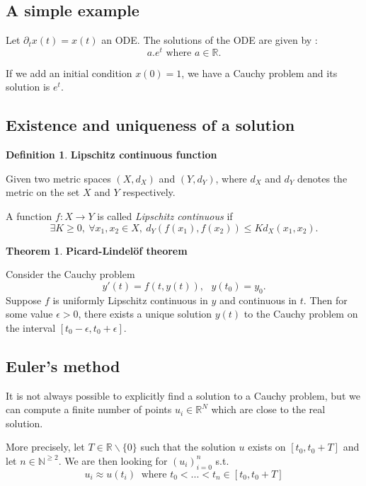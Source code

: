 \documentclass[10pt,a4paper]{article}
\theoremstyle{definition}
\newtheorem{definition}{Definition}
\theoremstyle{definition}
\newtheorem{theorem}{Theorem}
\begin{document}
\subsection{A simple example}
Let $\partial_t x(t) = x(t)$ an ODE. The solutions of the ODE are given by : 
$$
a . e^t \text{ where } a\in \mathbb{R}.
$$

If we add an initial condition $x(0) = 1$, we have a Cauchy problem and its solution is $e^t$.

\subsection{Existence and uniqueness of a solution}


\begin{definition}{\textbf{Lipschitz continuous function}}

Given two metric spaces $(X, d_X)$ and $(Y, d_Y)$, where $d_X$ and $d_Y$ denotes the metric on the set $X$ and $Y$ respectively. 

A function $f: X \rightarrow  Y$ is called \textit{Lipschitz continuous} if
$$
\exists K \geq 0, \  \forall x_1, x_2 \in X, \  d_Y(f(x_1), f(x_2)) \leq Kd_X(x_1, x_2).
$$
\end{definition}

\begin{theorem}{\textbf{Picard-Lindelöf theorem}}

Consider the Cauchy problem
$$
y'(t) = f(t, y(t)), \ \ \ y(t_0) = y_0.
$$
Suppose $f$ is uniformly Lipschitz continuous in $y$ and continuous in $t$. Then for some value $\epsilon > 0$, there exists a unique solution $y(t)$ to the Cauchy problem on the interval $[t_0 - \epsilon, t_0 + \epsilon]$. 
\end{theorem}

\subsection{Euler's method}
It is not always possible to explicitly find a solution to a Cauchy problem, but we can compute a finite number of points $u_i \in \mathbb{R}^N$ which are close to the real solution. 

More precisely, let $T \in \mathbb{R}\backslash\{0\}$ such that the solution $u$ exists on $[t_0, t_0 + T]$ and let $n \in \mathbb{N}^{\geqslant 2}$. We are then looking for $(u_i)^n_{i=0}$ s.t. 
\[
u_i \approx u(t_i) \ \text{ where } t_0 < ... < t_n \in [t_0, t_0 + T]
\]
\end{document}
